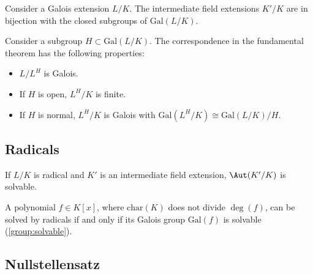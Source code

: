     \begin{theorem}
        Consider a Galois extension $L/K$. The intermediate field extensions $K'/K$ are in bijection with the closed subgroups of $\mathrm{Gal}(L/K)$.
    \end{theorem}
    \begin{property}
        Consider a subgroup $H\subset\mathrm{Gal}(L/K)$. The correspondence in the fundamental theorem has the following properties:
        \begin{itemize}
            \item $L/L^H$ is Galois.
            \item If $H$ is open, $L^H/K$ is finite.
            \item If $H$ is normal, $L^H/K$ is Galois with $\mathrm{Gal}\left(L^H/K\right)\cong\mathrm{Gal}(L/K)/H$.
        \end{itemize}
    \end{property}

\subsection{Radicals}


    \begin{property}
        If $L/K$ is radical and $K'$ is an intermediate field extension, $\Aut(K'/K)$ is solvable.
    \end{property}

    \begin{theorem}[Galois]
        A polynomial $f\in K[x]$, where $\mathrm{char}(K)$ does not divide $\deg(f)$, can be solved by radicals if and only if its Galois group $\mathrm{Gal}(f)$ is solvable (\cref{group:solvable}).
    \end{theorem}


\subsection{Nullstellensatz}

